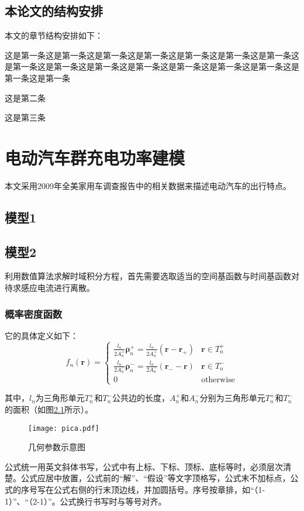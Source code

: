 \documentclass[bachelor]{NCEPU-thesis}
\begin{document}
\section{本论文的结构安排}
本文的章节结构安排如下：

 这是第一条这是第一条这是第一条这是第一条这是第一条这是第一条这是第一条这是第一条这是第一条这是第一条这是第一条这是第一条这是第一条这是第一条这是第一条这是第一条

 这是第二条

 这是第三条

\chapter{电动汽车群充电功率建模}
本文采用2009年全美家用车调查报告中的相关数据来描述电动汽车的出行特点。

\section{模型1}

\section{模型2}
利用数值算法求解时域积分方程，首先需要选取适当的空间基函数与时间基函数对待求感应电流进行离散。

\subsection{概率密度函数}
它的具体定义如下：
\begin{equation}
f_n(\bm{r})=
\begin{cases}
\frac{l_n}{2A_n^+}\bm{\rho}_n^+=\frac{l_n}{2A_n^+}(\bm{r}-\bm{r}_+)&\bm{r}\in T_n^+\\
\frac{l_n}{2A_n^-}\bm{\rho}_n^-=\frac{l_n}{2A_n^-}(\bm{r}_--\bm{r})&\bm{r}\in T_n^-\\
0&\text{otherwise}
\end{cases}
\end{equation}

其中，$l_n$为三角形单元$T_n^+$和$T_n^-$公共边的长度，$A_n^+$和$A_n^-$分别为三角形单元$T_n^+$和$T_n^-$的面积（如图\ref{pica}所示）。

\begin{figure}[h]
	\texttt{[image: pica.pdf]}
	\caption{几何参数示意图}
	\label{pica}
\end{figure}

公式统一用英文斜体书写，公式中有上标、下标、顶标、底标等时，必须层次清楚。公式应居中放置，公式前的“解”、“假设”等文字顶格写，公式末不加标点，公式的序号写在公式右侧的行末顶边线，并加圆括号。序号按章排，如“（1-1）”、“（2-1）”。公式换行书写时与等号对齐。
\end{document}
